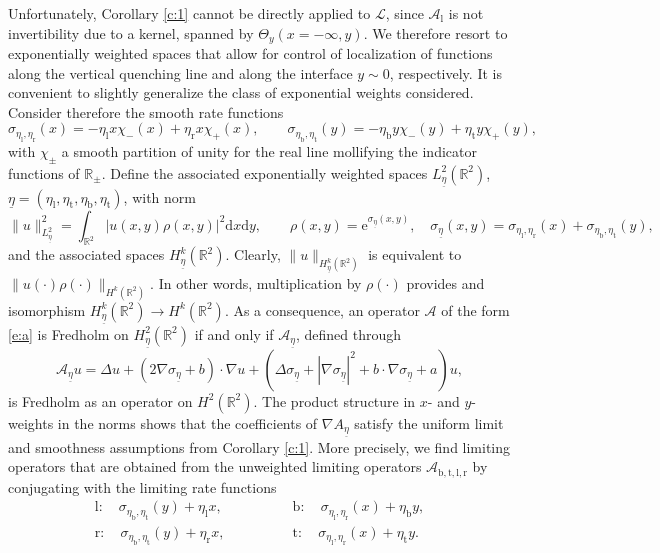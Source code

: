\documentclass[10pt]{article}
\newcommand{\R}{\mathbb{R}}
\newcommand{\rmd}{\mathrm{d}}
\newcommand{\rme}{\mathrm{e}}
\begin{document}
Unfortunately, Corollary \ref{c:1} cannot be directly applied to $\mathscr{L}$, since $\mathcal{A}_\mathrm{l}$ is not invertibility due to a kernel, spanned by $\Theta_y(x=-\infty,y)$.  We therefore resort to exponentially weighted spaces that allow for control of localization of functions along the vertical quenching line and along the interface $y\sim 0$, respectively. It is convenient to slightly generalize the class of exponential weights considered. Consider therefore the smooth rate functions 
\[
\sigma_{\eta_\mathrm{l},\eta_\mathrm{r}}(x)=-\eta_\mathrm{l}x\chi_-(x)+\eta_\mathrm{r}x\chi_+(x),\qquad
\sigma_{\eta_\mathrm{b},\eta_\mathrm{t}}(y)=-\eta_\mathrm{b}y\chi_-(y)+\eta_\mathrm{t}y\chi_+(y),
\]
with $\chi_\pm$ a smooth partition of unity for the real line mollifying the indicator functions of $\R_\pm$. Define the associated exponentially weighted spaces $L^2_{{\underline{\eta}}}(\R^2)$, ${\underline{\eta}}=(\eta_\mathrm{l},\eta_\mathrm{t},\eta_\mathrm{b},\eta_\mathrm{t})$, with norm
\[
\|u\|^2_{L^2_{\underline{\eta}}}=\int_{\R^2} \left|u(x,y)\rho(x,y)\right|^2\rmd x\rmd y,\qquad \rho(x,y)=\rme^{\sigma_{\underline{\eta}}(x,y)},\quad \sigma_{\underline{\eta}}(x,y)=\sigma_{\eta_\mathrm{l},\eta_\mathrm{r}}(x)+\sigma_{\eta_\mathrm{b},\eta_\mathrm{t}}(y),
\]
and the associated spaces $H^k_{\underline{\eta}}(\R^2)$.
Clearly, $\displaystyle{\|u\|_{H^k_{\underline{\eta}}(\R^2)}}$ is equivalent to $\displaystyle{\|u(\cdot)\rho(\cdot)\|_{H^k(\R^2)}}$. In other words, multiplication by $\rho(\cdot)$ provides and isomorphism $\displaystyle{H^k_{\underline{\eta}}(\R^2)\to H^k(\R^2)}$. As a consequence, an operator $\mathcal{A}$ of the form \eqref{e:a} is Fredholm on $H^2_{\underline{\eta}}(\R^2)$ if and only if $\mathcal{A}_{\underline{\eta}}$, defined through
\begin{equation}\label{e:wc}
\mathcal{A}_{\underline{\eta}} u=\Delta u + (2\nabla\sigma_{\underline{\eta}}+b)\cdot \nabla u + (\Delta \sigma_{\underline{\eta}}+|\nabla\sigma_{\underline{\eta}}|^2+b\cdot\nabla\sigma_{\underline{\eta}}+a)u,
\end{equation}
is Fredholm as an operator on $H^2(\R^2)$. The product structure in $x$- and $y$-weights in the norms shows that the coefficients of $\nabla{A}_{\underline{\eta}}$ satisfy the uniform limit and smoothness assumptions from Corollary \ref{c:1}. More precisely, we find limiting operators that are obtained from the unweighted limiting operators $\mathcal{A}_\mathrm{b,t,l,r}$ by conjugating with the limiting rate functions 
\begin{equation}
\begin{array}{ll}
\mathrm{l}:\quad\sigma_{\eta_\mathrm{b},\eta_\mathrm{t}}(y)+\eta_\mathrm{l}x,&
\qquad \qquad
\mathrm{b}:\quad\sigma_{\eta_\mathrm{l},\eta_\mathrm{r}}(x)+\eta_\mathrm{b}y,\\
\mathrm{r}:\quad\sigma_{\eta_\mathrm{b},\eta_\mathrm{t}}(y)+\eta_\mathrm{r}x,&
\qquad \qquad
\mathrm{t}:\quad\sigma_{\eta_\mathrm{l},\eta_\mathrm{r}}(x)+\eta_\mathrm{t}y.
\end{array}\label{e:asyw}
\end{equation}
\end{document}
